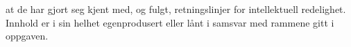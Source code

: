 
 at de har gjort seg kjent med, og fulgt, retningslinjer for intellektuell redelighet. Innhold er i sin helhet egenprodusert eller lånt i samsvar med rammene gitt i oppgaven.
